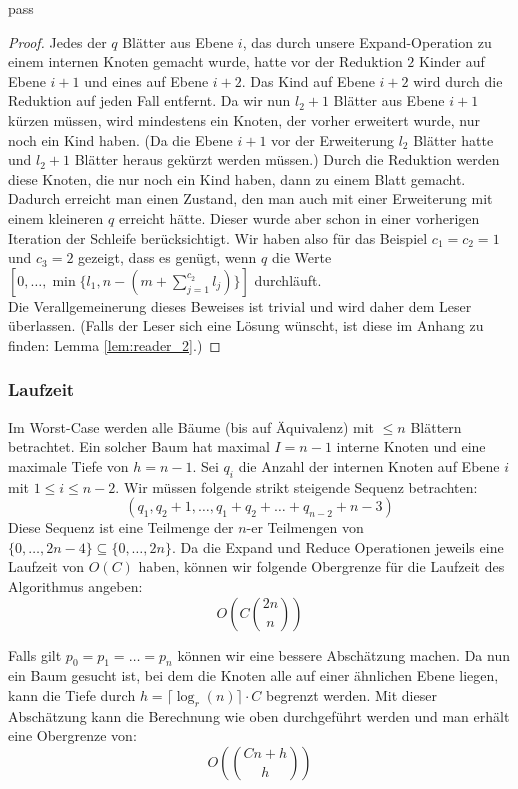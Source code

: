 pass\documentclass[a4paper,10pt,ngerman]{scrartcl}
\begin{document}
\begin{proof}
        Jedes der $q$ Blätter aus Ebene $i$, das durch unsere Expand-Operation zu einem internen Knoten gemacht wurde, hatte vor der Reduktion $2$ Kinder auf Ebene $i + 1$ und eines auf Ebene $i + 2$.
        Das Kind auf Ebene $i + 2$ wird durch die Reduktion auf jeden Fall entfernt.
        Da wir nun $l_2 + 1$ Blätter aus Ebene $i + 1$ kürzen müssen, wird mindestens ein Knoten, der vorher erweitert wurde, nur noch ein Kind haben. (Da die Ebene $i + 1$ vor der Erweiterung $l_2$ Blätter hatte und $l_2 + 1$ Blätter heraus gekürzt werden müssen.)
        Durch die Reduktion werden diese Knoten, die nur noch ein Kind haben, dann zu einem Blatt gemacht.
        Dadurch erreicht man einen Zustand, den man auch mit einer Erweiterung mit einem kleineren $q$ erreicht hätte.
        Dieser wurde aber schon in einer vorherigen Iteration der Schleife berücksichtigt.
        Wir haben also für das Beispiel $c_1 = c_2 = 1$ und $c_3 = 2$ gezeigt, dass es genügt, wenn $q$ die Werte $[0, \dots, \min\{l_1, n - (m + \sum^{c_2}_{j=1} l_j)\}]$ durchläuft.\\
        Die Verallgemeinerung dieses Beweises ist trivial und wird daher dem Leser überlassen.
        (Falls der Leser sich eine Lösung wünscht, ist diese im Anhang zu finden: Lemma \ref{lem:reader_2}.)
    \end{proof}

    \subsubsection{Laufzeit}
    Im Worst-Case werden alle Bäume (bis auf Äquivalenz) mit $\le n$ Blättern betrachtet.
    Ein solcher Baum hat maximal $I = n - 1$ interne Knoten und eine maximale Tiefe von $h = n - 1$.
    Sei $q_i$ die Anzahl der internen Knoten auf Ebene $i$ mit $1 \le i \le n - 2$.
    Wir müssen folgende strikt steigende Sequenz betrachten:
    \[(q_1, q_2 + 1, \dots, q_1 + q_2 + \dots + q_{n - 2} + n - 3)\]
    Diese Sequenz ist eine Teilmenge der $n$-er Teilmengen von $\{0, \dots, 2n - 4\} \subseteq \{0, \dots, 2n\}$.
    Da die Expand und Reduce Operationen jeweils eine Laufzeit von $O(C)$ haben, können wir folgende Obergrenze für die Laufzeit des Algorithmus angeben:
    \[O\left(C{{2n} \choose n}  \right)\]

    Falls gilt $p_0 = p_1 = \dots = p_n$ können wir eine bessere Abschätzung machen.
    Da nun ein Baum gesucht ist, bei dem die Knoten alle auf einer ähnlichen Ebene liegen, kann die Tiefe durch $h = \lceil \log_r(n) \rceil \cdot C$
    begrenzt werden.
    Mit dieser Abschätzung kann die Berechnung wie oben durchgeführt werden und man erhält eine Obergrenze von:
    \[O\left(C{n + h} \choose h \right)\]
\end{document}
